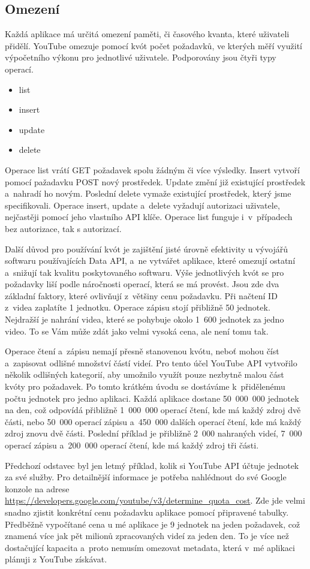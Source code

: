 \subsection{Omezení}
\par Každá aplikace má určitá omezení paměti\cite{quota}\cite{googleconsole}, či časového kvanta, které uživateli přidělí. YouTube omezuje pomocí kvót počet požadavků, ve kterých měří využití výpočetního výkonu pro jednotlivé uživatele. Podporovány jsou čtyři typy operací.
\begin{itemize}
\item {list}
\item {insert}
\item {update}
\item {delete}
\end{itemize}
\par Operace list vrátí GET požadavek spolu žádným či více výsledky. Insert vytvoří pomocí pažadavku POST nový prostředek. Update změní již existující prostředek a~nahradí ho novým. Poslední delete vymaže existující prostředek, který jsme specifikovali. Operace insert, update a~delete vyžadují autorizaci uživatele, nejčastěji pomocí jeho vlastního API\cite{apistart} klíče. Operace list funguje i~v~případech bez autorizace, tak s autorizací.
\par Další důvod pro používání kvót je zajištění jisté úrovně efektivity u vývojářů softwaru používajících Data API, a~ne vytvářet aplikace, které omezují ostatní a~snižují tak kvalitu poskytovaného softwaru. Výše jednotlivých kvót se pro požadavky liší podle náročnosti operací, která se má provést. Jsou zde dva základní faktory, které ovlivňují z~většiny cenu požadavku. Při načtení ID z~videa zaplatíte 1 jednotku. Operace zápisu stojí přibližně 50 jednotek. Nejdražší je nahrání videa, které se pohybuje okolo 1~600 jednotek za jedno video. To se Vám může zdát jako velmi vysoká cena, ale není tomu tak. 
\par Operace čtení a~zápisu nemají přesně stanovenou kvótu, neboť mohou číst a~zapisovat odlišné množství částí videí. Pro tento účel YouTube API vytvořilo několik odlišných kategorií, aby umožnilo využít pouze nezbytně malou část kvóty pro požadavek. Po tomto krátkém úvodu se dostáváme k~přidělenému počtu jednotek pro jedno aplikaci. Každá aplikace dostane 50~000~000 jednotek na den, což odpovídá přibližně 1~000~000 operací čtení, kde má každý zdroj dvě části, nebo 50~000 operací zápisu a~450~000 dalších operací čtení, kde má každý zdroj znovu dvě části. Poslední příklad je přibližně 2~000 nahraných videí, 7~000 operací zápisu a~200~000 operací čtení, kde má každý zdroj tři části.
\par Předchozí odstavec byl jen letmý příklad, kolik si YouTube API účtuje jednotek za své služby. Pro detailnější informace je potřeba nahlédnout do své Google konzole na adrese \url{https://developers.google.com/youtube/v3/determine_quota_cost}\cite{quota}. Zde jde velmi snadno zjistit konkrétní cenu požadavku aplikace pomocí připravené tabulky. Předběžně vypočítané cena u mé aplikace je 9 jednotek na jeden požadavek, což znamená více jak pět milionů zpracovaných videí za jeden den. To je více než dostačující kapacita a~proto nemusím omezovat metadata, která v~mé aplikaci plánuji z YouTube získávat. 